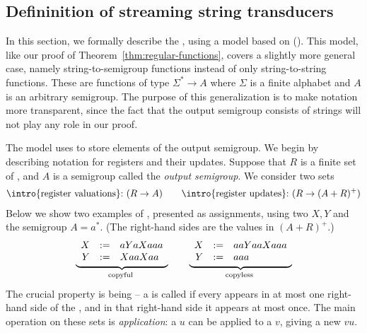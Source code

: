 \subsection{Defininition of streaming string transducers}
\label{sec:sst-definition}
In this section, we formally describe the , using a model based on  (\sst).  This model, like our proof of Theorem~\ref{thm:regular-functions}, covers a slightly more general case, namely string-to-semigroup functions instead of only string-to-string functions. These are functions of type $\Sigma^* \to A$ where $\Sigma$ is a finite alphabet and $A$ is an arbitrary semigroup.  The purpose of this generalization is to make notation more transparent, since the fact that the output semigroup consists of strings will not play any role in our proof.

\AP The model uses  to store elements of the output semigroup. We begin by describing notation for registers and their updates. Suppose that $R$ is a finite set of , and $A$ is a semigroup called the \emph{output semigroup}. We consider two sets 
\begin{align*}
    \text{\intro{register valuations}:}\ (R \to A)
  \qquad
    \text{\intro{register updates}:}\ (R \to (A+R)^+)
\end{align*}
Below we show two examples of , presented as assignments, using two  $X,Y$ and the semigroup $A = a^*$. (The right-hand sides are the values in $(A+R)^+$.)
\begin{align*}
    \myunderbrace{
    \begin{array}{rcl}
        X &:=& aYaXaaa\\
    Y &:=& XaaXaa
    \end{array}
    }{copyful}
    \qquad 
    \myunderbrace{
    \begin{array}{rcl}
        X &:=& aaYaaXaaa\\
    Y &:=& aaa
    \end{array}
    }{copyless}
    \end{align*}
\AP The crucial property is being  -- a  is called  if every  appears in at most one right-hand side of the , and in that right-hand side it appears at most once. 
The main operation on these sets is \emph{application}: a  $u$
can be applied to a  $v$, giving a new  $vu$. 


